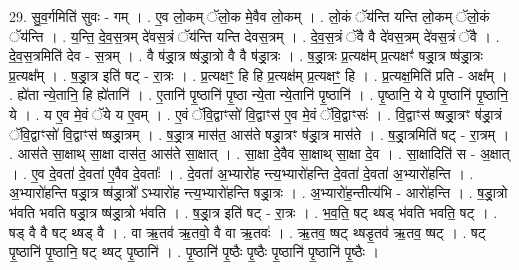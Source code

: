 \documentclass[17pt]{extarticle}
\begin{document}
29. सु॒व॒र्गमिति॑ सुवः - गम् । . ए॒व लो॒कम् ॅलो॒क मे॒वैव लो॒कम् । . लो॒कं ॅय॑न्ति यन्ति लो॒कम् ॅलो॒कं ॅय॑न्ति । . य॒न्ति॒ दे॒व॒स॒त्रम् दे॑वस॒त्रं ॅय॑न्ति यन्ति देवस॒त्रम् । . दे॒व॒स॒त्रं ॅवै वै दे॑वस॒त्रम् दे॑वस॒त्रं ॅवै । . दे॒व॒स॒त्रमिति॑ देव - स॒त्रम् । . वै ष॑ड्रा॒त्र ष्ष॑ड्रा॒त्रो वै वै ष॑ड्रा॒त्रः । . ष॒ड्रा॒त्रः प्र॒त्यक्ष॑म् प्र॒त्यक्षꣳ॑ षड्रा॒त्र ष्ष॑ड्रा॒त्रः प्र॒त्यक्ष᳚म् । . ष॒ड्रा॒त्र इति॑ षट् - रा॒त्रः । . प्र॒त्यक्षꣳ॒॒ हि हि प्र॒त्यक्ष॑म् प्र॒त्यक्षꣳ॒॒ हि । . प्र॒त्यक्ष॒मिति॑ प्रति - अक्ष᳚म् । . ह्ये॑ता न्ये॒तानि॒ हि ह्ये॑तानि॑ । . ए॒तानि॑ पृ॒ष्ठानि॑ पृ॒ष्ठा न्ये॒ता न्ये॒तानि॑ पृ॒ष्ठानि॑ । . पृ॒ष्ठानि॒ ये ये पृ॒ष्ठानि॑ पृ॒ष्ठानि॒ ये । . य ए॒व मे॒वं ॅये य ए॒वम् । . ए॒वं ॅवि॒द्वाꣳसो॑ वि॒द्वाꣳस॑ ए॒व मे॒वं ॅवि॒द्वाꣳसः॑ । . वि॒द्वाꣳस॑ ष्षड्रा॒त्रꣳ ष॑ड्रा॒त्रं ॅवि॒द्वाꣳसो॑ वि॒द्वाꣳस॑ ष्षड्रा॒त्रम् । . ष॒ड्रा॒त्र मास॑त॒ आस॑ते षड्रा॒त्रꣳ ष॑ड्रा॒त्र मास॑ते । . ष॒ड्रा॒त्रमिति॑ षट् - रा॒त्रम् । . आस॑ते सा॒क्षाथ् सा॒क्षा दास॑त॒ आस॑ते सा॒क्षात् । . सा॒क्षा दे॒वैव सा॒क्षाथ् सा॒क्षा दे॒व । . सा॒क्षादिति॑ स - अ॒क्षात् । . ए॒व दे॒वता॑ दे॒वता॑ ए॒वैव दे॒वताः᳚ । . दे॒वता॑ अ॒भ्यारो॑ह न्त्य॒भ्यारो॑हन्ति दे॒वता॑ दे॒वता॑ अ॒भ्यारो॑हन्ति । . अ॒भ्यारो॑हन्ति षड्रा॒त्र ष्ष॑ड्रा॒त्रो᳚ ऽभ्यारो॑ह न्त्य॒भ्यारो॑हन्ति षड्रा॒त्रः । . अ॒भ्यारो॑ह॒न्तीत्य॑भि - आरो॑हन्ति । . ष॒ड्रा॒त्रो भ॑वति भवति षड्रा॒त्र ष्ष॑ड्रा॒त्रो भ॑वति । . ष॒ड्रा॒त्र इति॑ षट् - रा॒त्रः । . भ॒व॒ति॒ षट् थ्षड् भ॑वति भवति॒ षट् । . षड् वै वै षट् थ्षड् वै । . वा ऋ॒तव॑ ऋ॒तवो॒ वै वा ऋ॒तवः॑ । . ऋ॒तव॒ ष्षट् थ्षडृ॒तव॑ ऋ॒तव॒ ष्षट् । . षट् पृ॒ष्ठानि॑ पृ॒ष्ठानि॒ षट् थ्षट् पृ॒ष्ठानि॑ । . पृ॒ष्ठानि॑ पृ॒ष्ठैः पृ॒ष्ठैः पृ॒ष्ठानि॑ पृ॒ष्ठानि॑ पृ॒ष्ठैः । \newline
\end{document}
